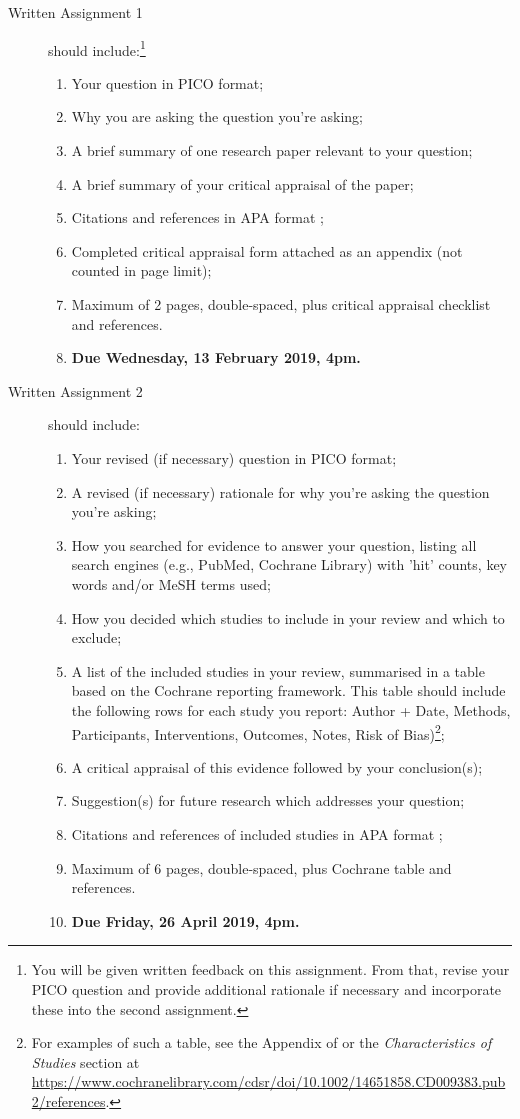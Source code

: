 \documentclass[a4paper, 11pt]{article}
\begin{document}
\begin{description}
	\item [Written Assignment 1] should include:\footnote{You will be given written feedback on this assignment. From that, revise your PICO question and provide additional rationale if necessary and incorporate these into the second assignment.}
	\begin{enumerate}
	\item Your question in PICO format;
	\item Why you are asking the question you're asking;
	\item A brief summary of one research paper relevant to your question;
	\item A brief summary of your critical appraisal of the paper;
	\item Citations and references in APA format \citep{AmericanPsychologicalAssociation2010};
	\item Completed critical appraisal form attached as an appendix (not counted in page limit);
	\item Maximum of 2 pages, double-spaced, plus critical appraisal checklist and references. 
	\item \textbf{Due Wednesday, 13 February 2019, 4pm.}
	\end{enumerate} 

	\item [Written Assignment 2] should include:
	\begin{enumerate}
	\item Your revised (if necessary) question in PICO format;
	\item A revised (if necessary) rationale for why you're asking the question you're asking;
	\item How you searched for evidence to answer your question, listing all search engines (e.g., PubMed, Cochrane Library) with 'hit' counts, key words and/or MeSH terms used;
	\item How you decided which studies to include in your review and which to exclude;
	\item A list of the included studies in your review, summarised in a table based on the Cochrane reporting framework. This table should include the following rows for each study you report: Author + Date, Methods, Participants, Interventions, Outcomes, Notes, Risk of Bias)\footnote{For examples of such a table, see the Appendix of \citet{Meinusch2011} or the \emph{Characteristics of Studies} section at \url{https://www.cochranelibrary.com/cdsr/doi/10.1002/14651858.CD009383.pub2/references}.}; 
	\item A critical appraisal of this evidence followed by your conclusion(s);
	\item Suggestion(s) for future research which addresses your question;
	\item Citations and references of included studies in APA format \citep{AmericanPsychologicalAssociation2010};
	\item Maximum of 6 pages, double-spaced, plus Cochrane table and references.
	\item \textbf{Due Friday, 26 April 2019, 4pm.}
	\end{enumerate}


\end{description}
\end{document}
